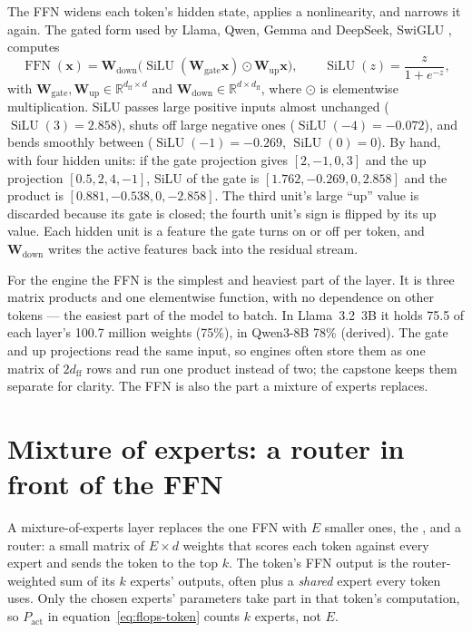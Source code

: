 The FFN widens each token's hidden state, applies a nonlinearity, and narrows
it again. The gated form used by Llama, Qwen, Gemma and DeepSeek, SwiGLU
\cite{shazeer2020glu}, computes
\begin{equation}
\operatorname{FFN}(\mathbf{x}) = \mathbf{W}_{\text{down}}
\bigl(\operatorname{SiLU}(\mathbf{W}_{\text{gate}}\mathbf{x})\odot
\mathbf{W}_{\text{up}}\mathbf{x}\bigr),
\qquad \operatorname{SiLU}(z) = \frac{z}{1 + e^{-z}},
\label{eq:swiglu}
\end{equation}
with $\mathbf{W}_{\text{gate}},\mathbf{W}_{\text{up}}\in\mathbb{R}^{d_{\mathrm{ff}}\times d}$
and $\mathbf{W}_{\text{down}}\in\mathbb{R}^{d\times d_{\mathrm{ff}}}$, where
$\odot$ is elementwise multiplication. SiLU passes large positive inputs almost
unchanged ($\operatorname{SiLU}(3) = 2.858$), shuts off large negative ones
($\operatorname{SiLU}(-4) = -0.072$), and bends smoothly between
($\operatorname{SiLU}(-1) = -0.269$, $\operatorname{SiLU}(0) = 0$). By hand,
with four hidden units: if the gate projection gives $[2, -1, 0, 3]$ and the up
projection $[0.5, 2, 4, -1]$, SiLU of the gate is $[1.762, -0.269, 0, 2.858]$
and the product is $[0.881, -0.538, 0, -2.858]$. The third unit's large ``up''
value is discarded because its gate is closed; the fourth unit's sign is flipped
by its up value. Each hidden unit is a feature the gate turns on or off per
token, and $\mathbf{W}_{\text{down}}$ writes the active features back into the
residual stream.

For the engine the FFN is the simplest and heaviest part of the layer. It is
three matrix products and one elementwise function, with no dependence on other
tokens --- the easiest part of the model to batch. In Llama~3.2~3B it holds
75.5 of each layer's 100.7 million weights (75\%), in Qwen3-8B 78\% (derived).
The gate and up projections read the same input, so engines often store them
as one matrix of $2d_{\mathrm{ff}}$ rows and run one product instead of two;
the capstone keeps them separate for clarity. The FFN is also the part a
mixture of experts replaces.

\section{Mixture of experts: a router in front of the FFN}

A mixture-of-experts layer \cite{shazeer2017moe,fedus2022switch} replaces the
one FFN with $E$ smaller ones, the , and a router: a small matrix
of $E \times d$ weights that scores each token against every expert and sends
the token to the top $k$. The token's FFN output is the router-weighted sum of
its $k$ experts' outputs, often plus a \emph{shared} expert every token uses.
Only the chosen experts' parameters take part in that token's computation, so
$P_{\text{act}}$ in equation~\eqref{eq:flops-token} counts $k$ experts, not $E$.

